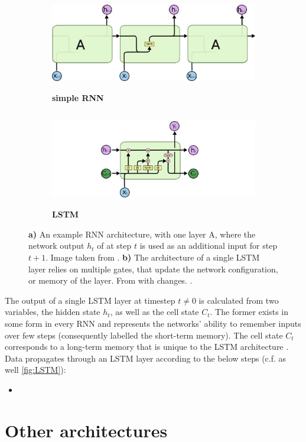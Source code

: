 \begin{figure}
	\centering
	\begin{subfigure}[h]{0.45\linewidth}
	\includegraphics[height=4.2cm]{imgs/simple_RNN.png}
	\caption{\textbf{simple RNN}\label{fig:simple-RNN}}
	\end{subfigure}
	\hfill
	\begin{subfigure}[h]{0.45\linewidth}
	\includegraphics[height=4.2cm]{imgs/LSTM.png}
	\caption{\textbf{LSTM}\label{fig:LSTM}}
	\end{subfigure}
	\caption*{\textbf{a)} An example RNN architecture, with one layer A, where the network output $h_t$ of at step $t$ is used as an additional input for step $t+1$. 
	Image taken from \cite{NN-images}. \textbf{b)} The architecture of a single LSTM layer relies on multiple gates, that update the network
	configuration, or memory of the layer. From \cite{NN-images} with changes. \label{fig:NN-architectures}.}
\end{figure}

The output of a single LSTM layer at timestep $t\neq0$ is calculated from two variables, the hidden state $h_t$, as well as the cell state $C_t$. The former exists in 
some form in every RNN and represents the networks' ability to remember inputs over few steps (consequently labelled the short-term memory). The cell state $C_t$
corresponds to a long-term memory that is unique to the LSTM architecture \cite{gers2000learning}. Data propagates through an LSTM layer according to the below steps
(c.f. as well \autoref{fig:LSTM}):

\begin{itemize}
	\item

\end{itemize}

\section{Other architectures}
\label{sec:NN-other}
